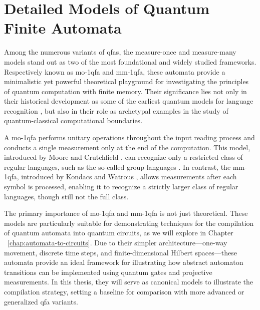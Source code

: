 \section{Detailed Models of Quantum Finite Automata}
\label{sec:detailed-models}
Among the numerous variants of \glspl{qfa}, the measure-once and measure-many models stand out as two of the most foundational and widely studied frameworks. Respectively known as \gls{mo-1qfa} and \gls{mm-1qfa}, these automata provide a minimalistic yet powerful theoretical playground for investigating the principles of quantum computation with finite memory. Their significance lies not only in their historical development as some of the earliest quantum models for language recognition \cite{moore2000quantum, kondacs1997power}, but also in their role as archetypal examples in the study of quantum-classical computational boundaries.

A \gls{mo-1qfa} performs unitary operations throughout the input reading process and conducts a single measurement only at the end of the computation. This model, introduced by Moore and Crutchfield \cite{moore2000quantum}, can recognize only a restricted class of regular languages, such as the so-called group languages \cite{brodsky2002characterizations}. In contrast, the \gls{mm-1qfa}, introduced by Kondacs and Watrous \cite{kondacs1997power}, allows measurements after each symbol is processed, enabling it to recognize a strictly larger class of regular languages, though still not the full class.

The primary importance of \gls{mo-1qfa} and \gls{mm-1qfa} is not just theoretical. These models are particularly suitable for demonstrating techniques for the compilation of quantum automata into quantum circuits, as we will explore in Chapter ~\ref{chap:automata-to-circuits}. Due to their simpler architecture—one-way movement, discrete time steps, and finite-dimensional Hilbert spaces—these automata provide an ideal framework for illustrating how abstract automaton transitions can be implemented using quantum gates and projective measurements. In this thesis, they will serve as canonical models to illustrate the compilation strategy, setting a baseline for comparison with more advanced or generalized \gls{qfa} variants.



